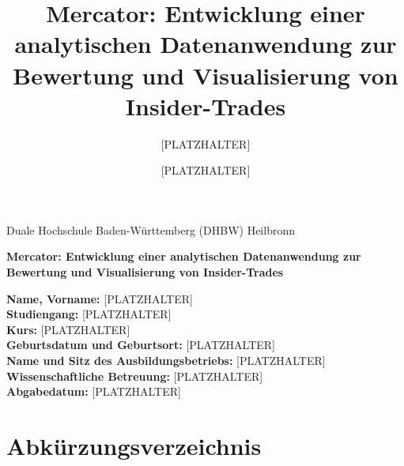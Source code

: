 \documentclass[11pt,a4paper,oneside]{scrartcl}
\title{Mercator: Entwicklung einer analytischen Datenanwendung zur Bewertung und Visualisierung von Insider-Trades}
\author{[PLATZHALTER]}
\date{[PLATZHALTER]}
\begin{document}
\begin{titlepage}
  \centering
  {\Large Duale Hochschule Baden-Württemberg (DHBW) Heilbronn\par}
  \vspace{2.5cm}
  {\LARGE\bfseries Mercator: Entwicklung einer analytischen Datenanwendung zur Bewertung und Visualisierung von Insider-Trades\par}
  \vspace{2cm}

  \begin{flushleft}
    \textbf{Name, Vorname:} [PLATZHALTER]\\
    \textbf{Studiengang:} [PLATZHALTER]\\
    \textbf{Kurs:} [PLATZHALTER]\\
    \textbf{Geburtsdatum und Geburtsort:} [PLATZHALTER]\\
    \textbf{Name und Sitz des Ausbildungsbetriebs:} [PLATZHALTER]\\
    \textbf{Wissenschaftliche Betreuung:} [PLATZHALTER]\\
    \textbf{Abgabedatum:} [PLATZHALTER]
  \end{flushleft}

  \vfill
\end{titlepage}

\tableofcontents
\clearpage

\section*{Abkürzungsverzeichnis}
\begin{acronym}[WCAG]
\end{acronym}
\clearpage

\listoffigures
{}
\clearpage

\listoftables
{}
\clearpage












\clearpage
\appendix


\clearpage
\printbibliography[title={Literaturverzeichnis}]

\clearpage

\end{document}

